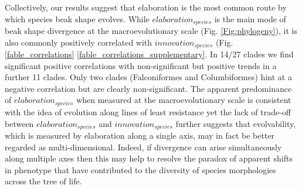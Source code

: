 \documentclass[12pt,letterpaper]{article}
\begin{document}
Collectively, our results suggest that elaboration is the most common route by which species beak shape evolves.
While $elaboration_{species}$ is the main mode of beak shape divergence at the macroevolutionary scale %
(Fig. \ref{Fig:phylogeny}), it is also commonly positively correlated with $innovation_{species}$ (Fig. \ref{fable_correlations} \ref{fable_correlations_supplementary}. %
In 14/27 clades we find significant positive correlations with non-significant but positive trends in a further 11 clades.
Only two clades (Falconiformes and Columbiformes) hint at a negative correlation but are clearly non-significant.
The apparent predominance of $elaboration_{species}$ when measured at the macroevolutionary scale is consistent with the idea of evolution along lines of least resistance %
yet the lack of trade-off between $elaboration_{species}$ and $innovation_{species}$ further suggests that evolvability, which is measured by elaboration along a single axis, may in fact be better regarded as multi-dimensional.
Indeed, if divergence can arise simultaneously along multiple axes then this may help to resolve the paradox of apparent shifts in phenotype that have contributed to the diversity of species morphologies across the tree of life.
\end{document}
